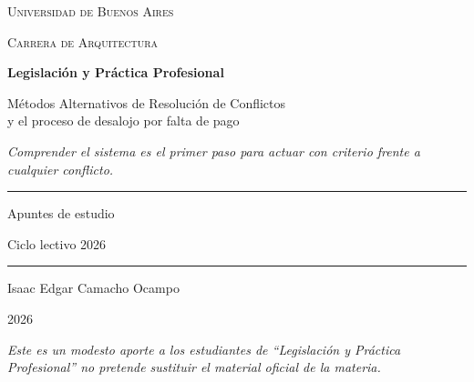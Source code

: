 \documentclass[12pt,oneside]{book}
\newcommand{\universidad}{Universidad de Buenos Aires}
\newcommand{\facultad}{Carrera de Arquitectura}
\newcommand{\materia}{Legislaci\'on y Pr\'actica Profesional}
\newcommand{\titulo}{M\'etodos Alternativos de Resoluci\'on de Conflictos\\[0.3em]y el proceso de desalojo por falta de pago}
\newcommand{\autor}{Isaac Edgar Camacho Ocampo}
\newcommand{\anio}{2026}
\begin{document}
\begin{titlepage}

\thispagestyle{empty}

\begin{center}

\vspace*{1cm}

{\large \textsc{\universidad}}

\vspace{0.3cm}

{\large \textsc{\facultad}}

\vspace{3cm}

{\Huge \textbf{\materia}}

\vspace{1cm}

{\LARGE \titulo}

\vspace{0.8cm}

\textit{Comprender el sistema es el primer paso para actuar con criterio frente a cualquier conflicto.}

\vspace{1.2cm}

\rule{0.70\textwidth}{0.5pt}

\vspace{0.5cm}

{\large Apuntes de estudio}

\vspace{0.3cm}

{\normalsize Ciclo lectivo 2026}

\vspace{0.5cm}

\rule{0.70\textwidth}{0.5pt}

\vfill

{\large \autor}

\vspace{0.3cm}

{\large \anio}

\end{center}

\vfill

\begin{flushleft}
\textit{Este es un modesto aporte a los estudiantes de ``Legislaci\'on y Pr\'actica Profesional'' no pretende sustituir el material oficial de la materia.}
\end{flushleft}

\end{titlepage}
\end{document}
